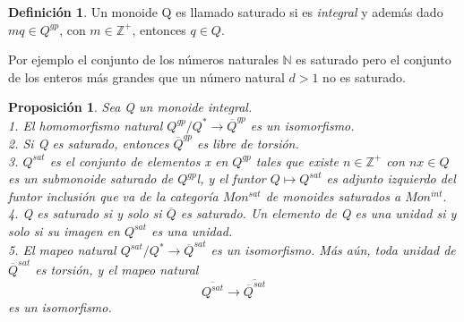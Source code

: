\documentclass[12pt,spanish]{amsart}
\newcommand{\bb}[1]{\mathbb{#1}}
\newtheorem{prop}[Theorem]{Proposición}
\theoremstyle{definition}
\newtheorem{Def}[Theorem]{Definición}
\theoremstyle{remark}
\begin{document}
\begin{Def}
Un monoide Q es llamado saturado si es \textit{integral} y además dado $mq\in Q^{gp}$, con $m\in \bb{Z}^{+}$, entonces $q\in Q$.
\end{Def}

Por ejemplo el conjunto de los números naturales $\bb{N}$ es saturado pero el conjunto de los enteros más grandes que un número natural $d>1$ no es saturado. 

\begin{prop}
Sea Q un monoide \textit{integral}. \\
1. El homomorfismo natural $Q^{gp}/Q^{\ast} \to \overline{Q}^{gp}$ es un isomorfismo. \\
2. Si Q es saturado, entonces $\overline{Q}^{gp}$ es libre de torsión. \\
3. $Q^{sat}$ es el conjunto de elementos x en $Q^{gp}$ tales que existe $n\in \bb{Z}^{+}$ con $nx\in Q$ es un submonoide saturado de $Q^{gp}$l, y el funtor $Q \mapsto Q^{sat}$ es adjunto izquierdo del funtor inclusión que va de la categoría $Mon^{sat}$ de monoides saturados a $Mon^{int}.$ \\
4. Q es saturado si y solo si $\overline{Q}$ es saturado. Un elemento de Q es una unidad si y solo si su imagen en $Q^{sat}$ es una unidad.\\
5. El mapeo natural $Q^{sat}/Q^{\ast} \to \overline{Q}^{sat}$ es un isomorfismo. Más aún, toda unidad de $\overline{Q}^{sat}$ es torsión, y el mapeo natural
$$\overline{Q^{sat}} \to \overline{\overline{Q}^{sat}}$$
es un isomorfismo. 
\end{prop} 
\end{document}
